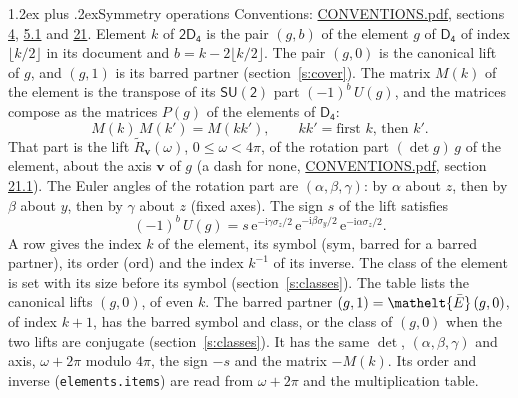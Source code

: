 \documentclass[10pt,a4paper]{article}
\makeatletter
\renewcommand\section{\@startsection{section}{1}{\z@}{-3ex plus -1ex minus -.2ex}%
  {1.2ex plus .2ex}{\normalfont\large\sffamily\bfseries\color{parttitle}}}
\numberwithin{equation}{section}
\newcommand{\eltfont}[1]{{\let\sigma\eltsigma\mathelt{#1}}}
\newcommand{\grp}[1]{\mathsf{#1}}
\newcommand{\elt}[1]{\eltfont{#1}}
\newcommand{\vv}{\mathbf{v}}
\newcommand{\iunit}{\mathrm{i}}
\newcommand{\expe}{\mathrm{e}}
\newcommand{\barred}[1]{\bar{#1}}
\newcommand{\lift}[1]{\tilde{#1}}
\newcommand{\pauli}[1]{\sigma_{#1}}
\makeatother
\begin{document}
\section{Symmetry operations}\label{s:elements}
Conventions: \href{../../CONVENTIONS.pdf}{CONVENTIONS.pdf}, sections \href{../../../rotation/CONVENTIONS.pdf\#conv.4}{4}, \href{../../../rotation/CONVENTIONS.pdf\#conv.5.1}{5.1} and \href{../../CONVENTIONS.pdf\#conv.21}{21}.
\leavevmode\label{n:index.element}\label{n:element.g}Element $k$ of $\grp{2D_{4}}$ is the pair $(g, b)$ of the element $g$ of \href{../../../rotation/data/pdf/D4.pdf}{$\grp{D_{4}}$} of index $\lfloor k/2\rfloor$ in its document and $b = k - 2\lfloor k/2\rfloor$. The pair $(g, 0)$ is the canonical lift of $g$, and $(g, 1)$ is its barred partner (section~\ref{s:cover}). \label{n:matrix.element.pin}\label{n:matrix.element}The matrix $M(k)$ of the element is the transpose of its $\grp{SU(2)}$ part $(-1)^{b}\,U(g)$, and the matrices compose as the matrices $P(g)$ of the elements of $\grp{D_{4}}$:
\begin{equation}\label{e:mprod}M(k)\,M(k') = M(kk'),\qquad kk' = \text{first } k\text{, then } k'.\end{equation}
\leavevmode\label{n:angle.omega}\label{n:vector.axis}\label{n:vector.pole}That part is the lift $\lift{R}_{\vv}(\omega)$, $0 \le \omega < 4\pi$, of the rotation part $(\det g)\,g$ of the element, about the axis $\vv$ of $g$ (a dash for none, \href{../../CONVENTIONS.pdf}{CONVENTIONS.pdf}, section \href{../../CONVENTIONS.pdf\#conv.21.1}{21.1}). \label{n:angle.euler.alpha}\label{n:angle.euler.beta}\label{n:angle.euler.gamma}\label{n:vector.coordinates}The Euler angles of the rotation part are $(\alpha,\beta,\gamma)$: by $\alpha$ about $z$, then by $\beta$ about $y$, then by $\gamma$ about $z$ (fixed axes). \label{n:local.euler.sign}The sign $s$ of the lift satisfies
\begin{equation}\label{e:euler}(-1)^{b}\,U(g) = s\,\expe^{-\iunit\gamma\pauli{z}/2}\,\expe^{-\iunit\beta\pauli{y}/2}\,\expe^{-\iunit\alpha\pauli{z}/2}.\end{equation}
\leavevmode\label{n:index.element.inverse}\label{n:head.sym}\label{n:head.ord}A row gives the index $k$ of the element, its symbol (sym, barred for a barred partner), its order (ord) and the index $k^{-1}$ of its inverse. \label{n:head.class}The class of the element is set with its size before its symbol (section~\ref{s:classes}).
The table lists the canonical lifts $(g, 0)$, of even $k$. The barred partner $(g, 1) = \elt{\barred{E}}\,(g, 0)$, of index $k + 1$, has the barred symbol and class, or the class of $(g, 0)$ when the two lifts are conjugate (section~\ref{s:classes}). It has the same $\det$, $(\alpha,\beta,\gamma)$ and axis, $\omega + 2\pi$ modulo $4\pi$, the sign $-s$ and the matrix $-M(k)$. Its order and inverse (\texttt{elements.items}) are read from $\omega + 2\pi$ and the multiplication table.
\end{document}
